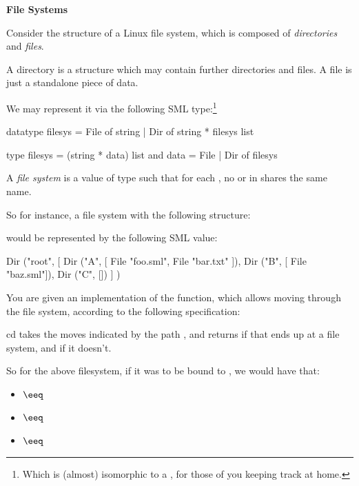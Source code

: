 
\textbf{File Systems}

Consider the structure of a Linux file system, which is composed of \textit{directories}
and \textit{files}.

A directory is a structure which may contain further directories and files. A file
is just a standalone piece of data.

We may represent it via the following SML type:\footnote{Which is (almost) isomorphic to
a , for those of you keeping track at home.}
\begin{codeblock}
  datatype filesys =
      File of string
    | Dir of string * filesys list

  type filesys = (string * data) list
  and data = File | Dir of filesys
\end{codeblock}

A \textit{file system} is a value of type  such that for each
, no  or  in  shares the
same name.

So for instance, a file system with the following structure:

\begin{minipage}{\linewidth} %
\end{minipage}

would be represented by the following SML value:
\begin{codeblock}
  Dir ("root",
    [ Dir ("A", [ File "foo.sml", File "bar.txt" ]),
      Dir ("B", [ File "baz.sml"]),
      Dir ("C", [])
    ]
  )
\end{codeblock}

\newpage

You are given an implementation of the  function, which allows
moving through the file system, according to the following specification:

\spec
  {cd}
  {}
  {}
  { takes the moves indicated by the path ,
  and returns  if that ends up at a file system,
  and  if it doesn't.}

So for the above filesystem, if it was to be bound to , we would
have that:
\begin{itemize}
  \item {} $\eeq$ 
  \item {} $\eeq$ 
  \item {} $\eeq$ 
\end{itemize}

